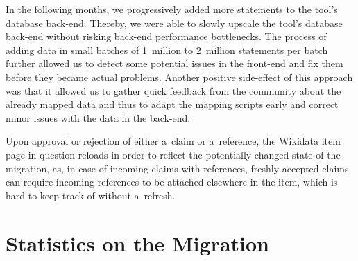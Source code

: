 \documentclass{sig-alternate-2013}
\begin{document}
In the following months, we progressively added more statements to the tool's database back-end.
Thereby, we were able to slowly upscale the tool's database back-end
without risking back-end performance bottlenecks.
The process of adding data in small batches of 1~million to 2~million statements per batch
further allowed us to detect some potential issues in the front-end
and fix them before they became actual problems.
Another positive side-effect of this approach was that it allowed us to gather quick feedback
from the community about the already mapped data and thus to adapt the mapping scripts early
and correct minor issues with the data in the back-end.

Upon approval or rejection of either a~claim or a~reference,
the Wikidata item page in question reloads in order to reflect
the potentially changed state of the migration, as,
in case of incoming claims with references, freshly accepted claims
can require incoming references to be attached elsewhere in the item,
which is hard to keep track of without a~refresh.

\section{Statistics on the Migration}\label{sec:statistics-of-the-migration}
\end{document}
